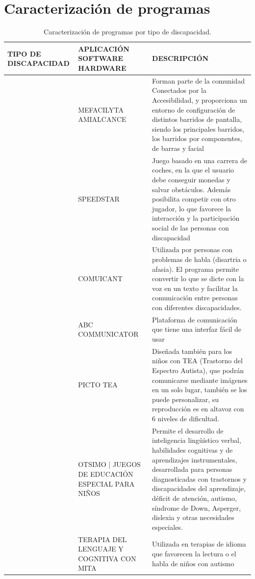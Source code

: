 \documentclass[spanish]{textolivre}
\begin{document}
\appendix
\section{Caracterización de programas}\label{apx-caract}

\setlength\LTleft{-1in}
\setlength\LTright{-1in}
\begin{small}
\begin{longtable}{
    p{}
    p{}    
    p{}    }
\caption{Caracterización de programas por tipo de discapacidad.}
\label{tab05}
\\
\toprule
TIPO DE DISCAPACIDAD & APLICACIÓN SOFTWARE HARDWARE & DESCRIPCIÓN \\
\midrule
\parbox[t]{2mm}{} & MEFACILYTA AMIALCANCE & Forman parte de la comunidad Conectados por la Accesibilidad, y proporciona un entorno de configuración de distintos barridos de pantalla, siendo los principales barridos, los barridos por componentes, de barras y facial \\
  & SPEEDSTAR & Juego basado en una carrera de coches, en la que el usuario debe conseguir monedas y salvar obstáculos. Además posibilita competir con otro jugador, lo que favorece la interacción y la participación social de las personas con discapacidad  \\
  & COMUICANT & Utilizada por personas con problemas de habla (disartria o afasia). El programa permite convertir lo que se dicte con la voz en un texto y facilitar la comunicación entre personas con diferentes discapacidades. \\
  & ABC COMMUNICATOR & Plataforma de comunicación que tiene una interfaz fácil de usar \\
  & PICTO TEA & Diseñada también para los niños con TEA (Trastorno del Espectro Autista), que podrán comunicarse mediante imágenes en un solo lugar, también se los puede personalizar, su reproducción es en altavoz con 6 niveles de dificultad. \\
  & OTSIMO | JUEGOS DE EDUCACIÓN ESPECIAL PARA NIÑOS & Permite el desarrollo de inteligencia lingüístico verbal, habilidades cognitivas y de aprendizajes instrumentales, desarrollada para personas diagnosticadas con trastornos y discapacidades del aprendizaje, déficit de atención, autismo, síndrome de Down, Asperger, dislexia y otras necesidades especiales. \\
 & TERAPIA DEL LENGUAJE Y COGNITIVA CON MITA & Utilizada en terapias de idioma que favorecen la lectura o el habla de niños con autismo \\

\end{longtable}
\end{small}
\end{document}
